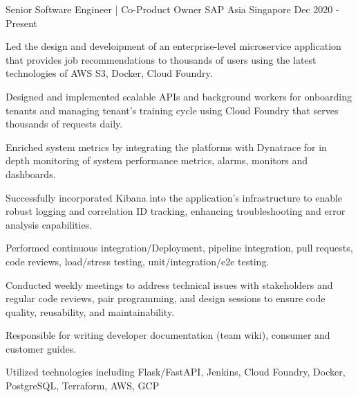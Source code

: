 

\begin{cventries}

  \cventry
    {Senior Software Engineer | Co-Product Owner} %
    {SAP Asia} %
    {Singapore} %
    {Dec 2020 - Present} %
    {
      \begin{cvitems} %
        \item {Led the design and develoipment of an enterprise-level microservice application that provides job recommendations to thousands of users using the latest technologies of AWS S3, Docker, Cloud Foundry.}
        \item {Designed and implemented scalable APIs and background workers for onboarding tenants and managing tenant's training cycle using Cloud Foundry that serves thousands of requests daily.}
        \item {Enriched system metrics by integrating the platforms with Dynatrace for in depth monitoring of system performance metrics, alarms, monitors and dashboards.}
        \item {Successfully incorporated Kibana into the application's infrastructure to enable robust logging and correlation ID tracking, enhancing troubleshooting and error analysis capabilities.}
        \item {Performed continuous integration/Deployment, pipeline integration, pull requests, code reviews, load/stress testing, unit/integration/e2e testing.}
        \item {Conducted weekly meetings to address technical issues with stakeholders and regular code reviews, pair programming, and design sessions to ensure code quality, reusability, and maintainability.}
        \item {Responsible for writing developer documentation (team wiki), consumer and customer guides. }
        \item {Utilized technologies including Flask/FastAPI, Jenkins, Cloud Foundry, Docker, PostgreSQL, Terraform, AWS, GCP}
      \end{cvitems}
    }


\end{cventries}
